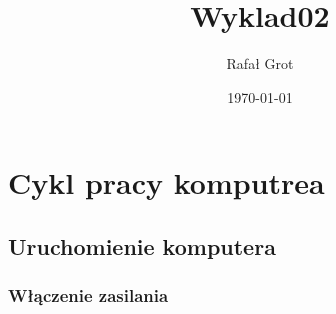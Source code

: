 \documentclass[11pt]{article}
\author{Rafał Grot}
\date{\today}
\title{Wyklad02}
\begin{document}
\maketitle
\tableofcontents

\section{Cykl pracy komputrea}
\label{sec:org34c4d30}
\subsection{Uruchomienie komputera}
\label{sec:orgeb1b0d8}
\subsubsection{Włączenie zasilania}
\label{sec:orgf562129}
\end{document}
